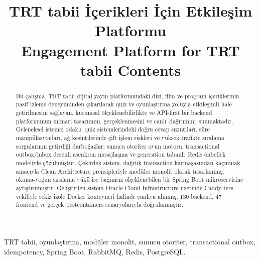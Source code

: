 \documentclass[conference,a4paper]{IEEEtran}
\begin{document}
\title{TRT tabii \.{I}\c{c}erikleri \.{I}\c{c}in Etkile\c{s}im Platformu\\
\large Engagement Platform for TRT tabii Contents}

\author{
}

\maketitle

\begin{abstract}
Bu \c{c}al\i\c{s}ma, TRT tabii dijital yay\i n platformundaki dizi, film ve program i\c{c}eriklerinin pasif izleme deneyiminden \c{c}\i kar\i larak quiz ve oyunla\c{s}t\i rma yoluyla etkile\c{s}imli hale getirilmesini sa\u{g}layan, kurumsal \"{o}l\c{c}eklenebilirlikte ve API-first bir backend platformunun mimari tasar\i m\i n\i, ger\c{c}eklenmesini ve canl\i\ da\u{g}\i t\i m\i n\i\ sunmaktad\i r. Geleneksel istemci odakl\i\ quiz sistemlerindeki do\u{g}ru cevap s\i z\i nt\i lar\i, s\"{u}re manip\"{u}lasyonlar\i, a\u{g} kesintilerinde \c{c}ift i\c{s}lem riskleri ve y\"{u}ksek trafikte s\i ralama sorgular\i n\i n getirdi\u{g}i darbo\u{g}azlar; sunucu otoriter oyun motoru, transactional outbox/inbox desenli asenkron mesajla\c{s}ma ve generation tabanl\i\ Redis \"{o}nbellek modeliyle \c{c}\"{o}z\"{u}lm\"{u}\c{s}t\"{u}r. \c{C}ekirdek sistem, da\u{g}\i t\i k transaction karma\c{s}as\i ndan ka\c{c}\i nmak amac\i yla Clean Architecture prensipleriyle mod\"{u}ler monolit olarak tasarlanm\i\c{s}; okuma-yo\u{g}un s\i ralama y\"{u}k\"{u} ise ba\u{g}\i ms\i z \"{o}l\c{c}eklenebilen bir Spring Boot mikroservisine ayr\i\c{s}t\i r\i lm\i\c{s}t\i r. Geli\c{s}tirilen sistem Oracle Cloud Infrastructure \"{u}zerinde Caddy ters vekiliyle sekiz izole Docker konteyneri halinde canl\i ya al\i nm\i\c{s}; 130 backend, 47 frontend ve ger\c{c}ek Testcontainers senaryolar\i yla do\u{g}rulanm\i\c{s}t\i r.
\end{abstract}

\begin{IEEEkeywords}
TRT tabii, oyunla\c{s}t\i rma, mod\"{u}ler monolit, sunucu otoriter, transactional outbox, idempotency, Spring Boot, RabbitMQ, Redis, PostgreSQL.
\end{IEEEkeywords}
\end{document}
